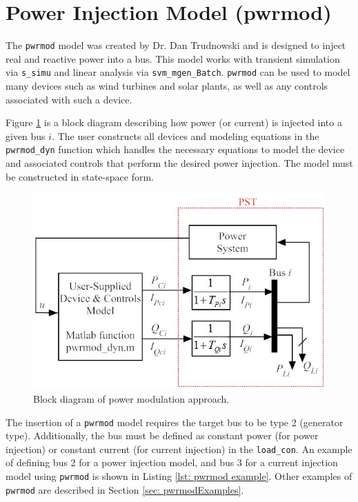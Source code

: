 \section{Power Injection Model (pwrmod)}  

The \verb|pwrmod| model was created by Dr. Dan Trudnowski and is designed to inject real and reactive power into a bus.
This model works with transient simulation via \verb|s_simu| and linear analysis via \verb|svm_mgen_Batch|.
\verb|pwrmod| can be used to model many devices such as wind turbines and solar plants, as well as any controls associated with such a device.

Figure \ref{fig: pwrmod BD} is a block diagram describing how power (or current) is injected into a given bus $i$.
The user constructs all devices and modeling equations in the \verb|pwrmod_dyn| function which handles the necessary equations to model the device and associated controls that perform the desired power injection.
The model must be constructed in state-space form.

\begin{figure}[H]
	\centering
	\footnotesize
	\includegraphics[width=.75\linewidth]{sections/pwrmod/BlockDiagram1}
	\caption{Block diagram of power modulation approach.}
	\label{fig: pwrmod BD}
\end{figure}%

The insertion of a \verb|pwrmod| model requires the target bus to be type 2 (generator type).
Additionally, the bus must be defined as constant power (for power injection) or constant current (for current injection) in the \verb|load_con|.
An example of defining bus 2 for a power injection model, and bus 3 for a current injection model using \verb|pwrmod| is shown in Listing \ref{lst: pwrmod example}.
Other examples of \verb|pwrmod| are described in Section \ref{sec: pwrmodExamples}.


